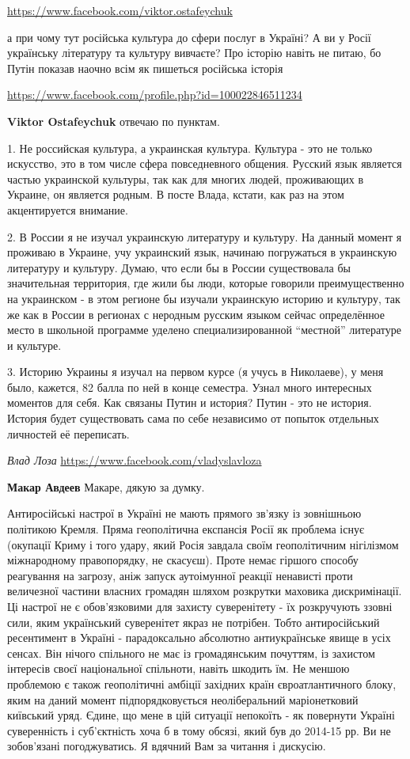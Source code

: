 \begin{itemize}

\url{https://www.facebook.com/viktor.ostafeychuk}

а при чому тут російська культура до сфери послуг в Україні? А ви у Росії
українську літературу та культуру вивчаєте? Про історію навіть не питаю, бо
Путін показав наочно всім як пишеться російська історія

\url{https://www.facebook.com/profile.php?id=100022846511234}

\textbf{Viktor Ostafeychuk} отвечаю по пунктам.

1. Не российская культура, а украинская культура. Культура - это не только
искусство, это в том числе сфера повседневного общения. Русский язык является
частью украинской культуры, так как для многих людей, проживающих в Украине, он
является родным. В посте Влада, кстати, как раз на этом акцентируется внимание.

2. В России я не изучал украинскую литературу и культуру. На данный момент я
проживаю в Украине, учу украинский язык, начинаю погружаться в украинскую
литературу и культуру. Думаю, что если бы в России существовала бы значительная
территория, где жили бы люди, которые говорили преимущественно на украинском -
в этом регионе бы изучали украинскую историю и культуру, так же как в России в
регионах с неродным русским языком сейчас определённое место в школьной
программе уделено специализированной \enquote{местной} литературе и культуре.

3. Историю Украины я изучал на первом курсе (я учусь в Николаеве), у меня было,
кажется, 82 балла по ней в конце семестра. Узнал много интересных моментов для
себя. Как связаны Путин и история? Путин - это не история. История будет
существовать сама по себе независимо от попыток отдельных личностей её
переписать.

\emph{Влад Лоза}
\url{https://www.facebook.com/vladyslavloza}

\textbf{Макар Авдеев} Макаре, дякую за думку. 

Антиросійські настрої в Україні не мають прямого зв'язку із зовнішньою
політикою Кремля. Пряма геополітична експансія Росії як проблема існує
(окупації Криму і того удару, який Росія завдала своїм геополітичним нігілізмом
міжнародному правопорядку, не скасуєш). Проте немає гіршого способу реагування
на загрозу, аніж запуск аутоімунної реакції ненависті проти величезної частини
власних громадян шляхом розкрутки маховика дискримінації. Ці настрої не є
обов'язковими для захисту суверенітету - їх розкручують ззовні сили, яким
український суверенітет якраз не потрібен. Тобто антиросійський ресентимент в
Україні - парадоксально абсолютно антиукраїнське явище в усіх сенсах. Він
нічого спільного не має із громадянським почуттям, із захистом інтересів своєї
національної спільноти, навіть шкодить їм. Не меншою проблемою є також
геополітичні амбіції західних країн євроатлантичного блоку, яким на даний
момент підпорядковується неоліберальний маріонетковий київський уряд. Єдине, що
мене в цій ситуації непокоїть - як повернути Україні суверенність і
суб'єктність хоча б в тому обсязі, який був до 2014-15 рр.  Ви не зобов'язані
погоджуватись. Я вдячний Вам за читання і дискусію.


\end{itemize}

